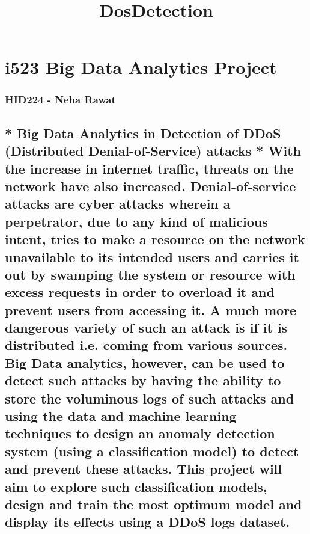 \documentclass[11pt]{article}
\title{DosDetection}
\begin{document}
    
    
    \maketitle
    
    

    
    \section{i523 Big Data Analytics
Project}\label{i523-big-data-analytics-project}

\subsubsection{HID224 - Neha Rawat}\label{hid224---neha-rawat}

\subsection{ * Big Data Analytics in Detection of DDoS (Distributed
Denial-of-Service) attacks * With the increase in internet traffic,
threats on the network have also increased. Denial-of-service attacks
are cyber attacks wherein a perpetrator, due to any kind of malicious
intent, tries to make a resource on the network unavailable to its
intended users and carries it out by swamping the system or resource
with excess requests in order to overload it and prevent users from
accessing it. A much more dangerous variety of such an attack is if it
is distributed i.e. coming from various sources. Big Data analytics,
however, can be used to detect such attacks by having the ability to
store the voluminous logs of such attacks and using the data and machine
learning techniques to design an anomaly detection system (using a
classification model) to detect and prevent these attacks. This project
will aim to explore such classification models, design and train the
most optimum model and display its effects using a DDoS logs
dataset.}\label{big-data-analytics-in-detection-of-ddos-distributed-denial-of-service-attacks-with-the-increase-in-internet-traffic-threats-on-the-network-have-also-increased.-denial-of-service-attacks-are-cyber-attacks-wherein-a-perpetrator-due-to-any-kind-of-malicious-intent-tries-to-make-a-resource-on-the-network-unavailable-to-its-intended-users-and-carries-it-out-by-swamping-the-system-or-resource-with-excess-requests-in-order-to-overload-it-and-prevent-users-from-accessing-it.-a-much-more-dangerous-variety-of-such-an-attack-is-if-it-is-distributed-i.e.-coming-from-various-sources.-big-data-analytics-however-can-be-used-to-detect-such-attacks-by-having-the-ability-to-store-the-voluminous-logs-of-such-attacks-and-using-the-data-and-machine-learning-techniques-to-design-an-anomaly-detection-system-using-a-classification-model-to-detect-and-prevent-these-attacks.-this-project-will-aim-to-explore-such-classification-models-design-and-train-the-most-optimum-model-and-display-its-effects-using-a-ddos-logs-dataset.}
\end{document}
